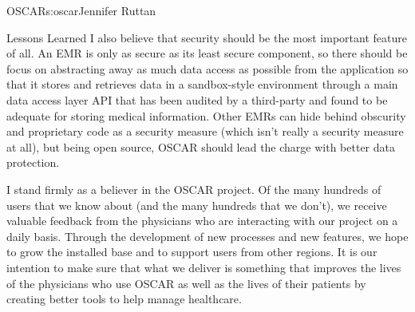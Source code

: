 \begin{aosachapter}{OSCAR}{s:oscar}{Jennifer Ruttan}
\begin{aosasect1}{Lessons Learned}
I also believe that security should be the most important feature of
all. An EMR is only as secure as its least secure component, so there
should be focus on abstracting away as much data access as possible
from the application so that it stores and retrieves data in a
sandbox-style environment through a main data access layer API that
has been audited by a third-party and found to be adequate for storing
medical information. Other EMRs can hide behind obscurity and
proprietary code as a security measure (which isn't really a security
measure at all), but being open source, OSCAR should lead the charge
with better data protection.

I stand firmly as a believer in the OSCAR project. Of the many
hundreds of users that we know about (and the many hundreds that we
don't), we receive valuable feedback from the physicians who are
interacting with our project on a daily basis. Through the development
of new processes and new features, we hope to grow the installed base
and to support users from other regions. It is our intention to make
sure that what we deliver is something that improves the lives of the
physicians who use OSCAR as well as the lives of their patients by
creating better tools to help manage healthcare.

\end{aosasect1}

\end{aosachapter}
